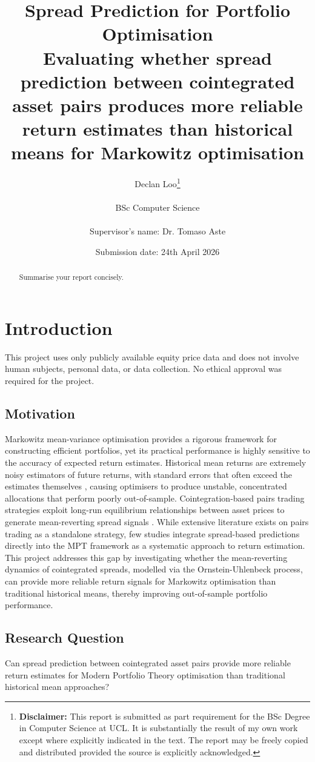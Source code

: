 \documentclass[a4paper]{report}
\title{{\vspace{-14em}}%
{{\Huge Spread Prediction for Portfolio Optimisation }}\\
{\large Evaluating whether spread prediction between cointegrated asset pairs produces more reliable return estimates than historical means for Markowitz optimisation }\\
}
\date{Submission date: 24th April 2026}
\author{Declan Loo\thanks{
{\bf Disclaimer:}
This report is submitted as part requirement for the BSc Degree in Computer Science at UCL. It is
substantially the result of my own work except where explicitly indicated in the text. The report may be freely copied and distributed provided the source is explicitly acknowledged.
}%
\\ \\
BSc Computer Science\\ \\
Supervisor's name: Dr. Tomaso Aste}
\begin{document}
\onehalfspacing
\maketitle
\begin{abstract}
Summarise your report concisely.
\end{abstract}

\tableofcontents
\setcounter{page}{1}


\chapter{Introduction}

This project uses only publicly available equity price data and does not involve human subjects, personal data, or data collection. No ethical approval was required for the project.

\section{Motivation}
Markowitz mean-variance optimisation \cite{markowitz1959} provides a rigorous framework for constructing efficient portfolios, yet its practical performance is highly sensitive to the accuracy of expected return estimates. Historical mean returns are extremely noisy estimators of future returns, with standard errors that often exceed the estimates themselves \cite{ledoit2004}, causing optimisers to produce unstable, concentrated allocations that perform poorly out-of-sample.
Cointegration-based pairs trading strategies exploit long-run equilibrium relationships between asset prices to generate mean-reverting spread signals \cite{gatev2006}. While extensive literature exists on pairs trading as a standalone strategy, few studies integrate spread-based predictions directly into the MPT framework as a systematic approach to return estimation.
This project addresses this gap by investigating whether the mean-reverting dynamics of cointegrated spreads, modelled via the Ornstein-Uhlenbeck process, can provide more reliable return signals for Markowitz optimisation than traditional historical means, thereby improving out-of-sample portfolio performance.

\section{Research Question}
Can spread prediction between cointegrated asset pairs provide more reliable return
estimates for Modern Portfolio Theory optimisation than traditional historical mean approaches?
\end{document}
